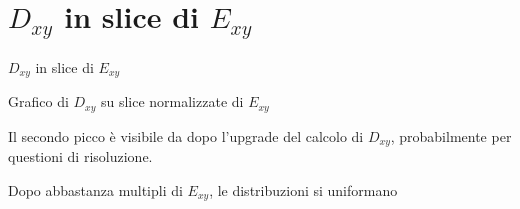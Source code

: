 \section{$D_{xy}$ in slice di $E_{xy}$}

\begin{frame}{$D_{xy}$ in slice di $E_{xy}$}
	\begin{block}{}
		Grafico di $D_{xy}$ su slice normalizzate di $E_{xy}$
		
		Il secondo picco \`e visibile da dopo l'upgrade del calcolo di $D_{xy}$, probabilmente per questioni di risoluzione.
		
		Dopo abbastanza multipli di $E_{xy}$, le distribuzioni si uniformano
	\end{block}
\end{frame}
